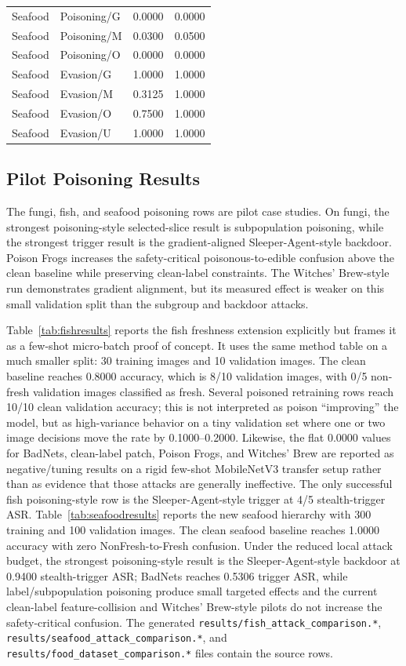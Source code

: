 ﻿\documentclass[6p,10pt,times]{ieeeaccess}
\begin{document}
\begin{table}[t]
\begin{tabular}{llrr}
Seafood & Poisoning/G & 0.0000 & 0.0000 \\
Seafood & Poisoning/M & 0.0300 & 0.0500 \\
Seafood & Poisoning/O & 0.0000 & 0.0000 \\
Seafood & Evasion/G & 1.0000 & 1.0000 \\
Seafood & Evasion/M & 0.3125 & 1.0000 \\
Seafood & Evasion/O & 0.7500 & 1.0000 \\
Seafood & Evasion/U & 1.0000 & 1.0000 \\
\bottomrule
\end{tabular}
\end{table}

\subsection{Pilot Poisoning Results}

The fungi, fish, and seafood poisoning rows are pilot case studies. On fungi, the strongest poisoning-style selected-slice result is subpopulation poisoning, while the strongest trigger result is the gradient-aligned Sleeper-Agent-style backdoor. Poison Frogs increases the safety-critical poisonous-to-edible confusion above the clean baseline while preserving clean-label constraints. The Witches' Brew-style run demonstrates gradient alignment, but its measured effect is weaker on this small validation split than the subgroup and backdoor attacks.

Table~\ref{tab:fishresults} reports the fish freshness extension explicitly but frames it as a few-shot micro-batch proof of concept. It uses the same method table on a much smaller split: 30 training images and 10 validation images. The clean baseline reaches 0.8000 accuracy, which is 8/10 validation images, with 0/5 non-fresh validation images classified as fresh. Several poisoned retraining rows reach 10/10 clean validation accuracy; this is not interpreted as poison ``improving'' the model, but as high-variance behavior on a tiny validation set where one or two image decisions move the rate by 0.1000--0.2000. Likewise, the flat 0.0000 values for BadNets, clean-label patch, Poison Frogs, and Witches' Brew are reported as negative/tuning results on a rigid few-shot MobileNetV3 transfer setup rather than as evidence that those attacks are generally ineffective. The only successful fish poisoning-style row is the Sleeper-Agent-style trigger at 4/5 stealth-trigger ASR. Table~\ref{tab:seafoodresults} reports the new seafood hierarchy with 300 training and 100 validation images. The clean seafood baseline reaches 1.0000 accuracy with zero NonFresh-to-Fresh confusion. Under the reduced local attack budget, the strongest poisoning-style result is the Sleeper-Agent-style backdoor at 0.9400 stealth-trigger ASR; BadNets reaches 0.5306 trigger ASR, while label/subpopulation poisoning produce small targeted effects and the current clean-label feature-collision and Witches' Brew-style pilots do not increase the safety-critical confusion. The generated \texttt{results/fish\_attack\_comparison.*}, \texttt{results/seafood\_attack\_comparison.*}, and \texttt{results/food\_dataset\_comparison.*} files contain the source rows.
\end{document}
